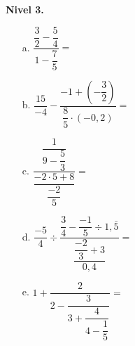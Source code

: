 \documentclass[spanish,letterpaper, 11pt, addpoints, answers]{exam}
\begin{document}
\begin{questions}
\textbf{Nivel 3.}
\begin{multicols}{2}
\begin{itemize}
\item[a.] $\dfrac{\dfrac{3}{2}-\dfrac{5}{4}}{1-\dfrac{7}{5}}=$
\vspace{1cm}
\item[b.] $\dfrac{15}{-4}-\dfrac{-1+\left(-\dfrac{3}{2}\right)}{\dfrac{8}{5}\cdot \left(-0{,}2\right)}=$
\vspace{1cm}
\item[c.] $\dfrac{\dfrac{1}{9-\dfrac{5}{3}}}{\dfrac{-2\cdot 5+8}{\dfrac{-2}{5}}}=$
\vspace{1cm}
\item[d.] $\dfrac{-5}{4}\div \dfrac{\dfrac{3}{4}-\dfrac{-1}{5}\div 1{,}\bar{5}}{\dfrac{\dfrac{-2}{3}+3}{0{,}4}}=$
\vspace{1cm}
\item[e.] $1+\dfrac{2}{2-\dfrac{3}{3+\dfrac{4}{4-\dfrac{1}{5}}}}=$

\end{itemize}
\end{multicols}
\end{questions}
\end{document}
